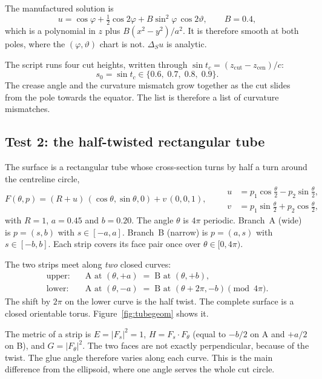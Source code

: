 The manufactured solution is
\begin{equation}
  u = \cos\varphi + \tfrac12\cos 2\varphi
      + B\sin^2\!\varphi\,\cos 2\vartheta , \qquad B = 0.4 ,
\end{equation}
which is a polynomial in $z$ plus $B(x^2-y^2)/a^2$. It is therefore
smooth at both poles, where the $(\varphi,\vartheta)$ chart is not.
$\Delta_S u$ is analytic.

The script runs four cut heights, written through
$\sin t_c = (z_{\mathrm{cut}} - z_{\mathrm{cen}})/c$:
\begin{equation}
  s_0 = \sin t_c \in \{0.6,\; 0.7,\; 0.8,\; 0.9\} .
\end{equation}
The crease angle and the curvature mismatch grow together as the cut
slides from the pole towards the equator. The list is therefore a list of
curvature mismatches.

\subsection{Test 2: the half-twisted rectangular tube}

The surface is a rectangular tube whose cross-section turns by half a
turn around the centreline circle,
\begin{equation}
  F(\theta,p) = (R+u)\,(\cos\theta,\sin\theta,0) + v\,(0,0,1),
  \qquad
  \begin{aligned}
    u &= p_1\cos\tfrac\theta2 - p_2\sin\tfrac\theta2,\\
    v &= p_1\sin\tfrac\theta2 + p_2\cos\tfrac\theta2,
  \end{aligned}
\end{equation}
with $R=1$, $a=0.45$ and $b=0.20$. The angle $\theta$ is $4\pi$ periodic.
Branch~A (wide) is $p=(s,b)$ with $s\in[-a,a]$. Branch~B (narrow) is
$p=(a,s)$ with $s\in[-b,b]$. Each strip covers its face pair once over
$\theta\in[0,4\pi)$.

The two strips meet along \emph{two} closed curves:
\begin{align}
  \text{upper:}&\quad \text{A at } (\theta,+a)
    \;=\; \text{B at } (\theta,+b), \\
  \text{lower:}&\quad \text{A at } (\theta,-a)
    \;=\; \text{B at } (\theta+2\pi,-b) \pmod{4\pi} .
\end{align}
The shift by $2\pi$ on the lower curve is the half twist. The complete
surface is a closed orientable torus. Figure~\ref{fig:tubegeom} shows it.

The metric of a strip is $E=|F_s|^2=1$, $H=F_s\cdot F_\theta$ (equal to
$-b/2$ on A and $+a/2$ on B), and $G=|F_\theta|^2$. The two faces are not
exactly perpendicular, because of the twist. The glue angle therefore
varies along each curve. This is the main difference from the ellipsoid,
where one angle serves the whole cut circle.

